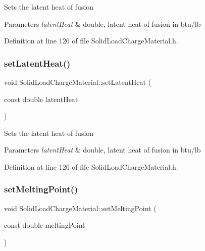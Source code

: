 Sets the latent heat of fusion 
\begin{DoxyParams}{Parameters}
{\em latent\+Heat} & double, latent heat of fusion in btu/lb \\
\hline
\end{DoxyParams}


Definition at line 126 of file Solid\+Load\+Charge\+Material.\+h.

\mbox{\label{class_solid_load_charge_material_ac7361119ab7cc352dfbdc6fcb9175981}} 
\subsubsection{\texorpdfstring{set\+Latent\+Heat()}{setLatentHeat()}\hspace{0.1cm}{\footnotesize\ttfamily [3/3]}}
{\footnotesize\ttfamily void Solid\+Load\+Charge\+Material\+::set\+Latent\+Heat (\begin{DoxyParamCaption}\item[{const double}]{latent\+Heat }\end{DoxyParamCaption})\hspace{0.3cm}{\ttfamily [inline]}}

Sets the latent heat of fusion 
\begin{DoxyParams}{Parameters}
{\em latent\+Heat} & double, latent heat of fusion in btu/lb \\
\hline
\end{DoxyParams}


Definition at line 126 of file Solid\+Load\+Charge\+Material.\+h.

\mbox{\label{class_solid_load_charge_material_a6c235b1c49be98b02829d37af9c38cb2}} 
\subsubsection{\texorpdfstring{set\+Melting\+Point()}{setMeltingPoint()}\hspace{0.1cm}{\footnotesize\ttfamily [1/3]}}
{\footnotesize\ttfamily void Solid\+Load\+Charge\+Material\+::set\+Melting\+Point (\begin{DoxyParamCaption}\item[{const double}]{melting\+Point }\end{DoxyParamCaption})\hspace{0.3cm}{\ttfamily [inline]}}

